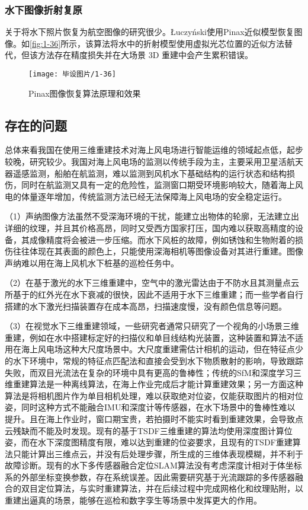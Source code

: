 \subsubsection{水下图像折射复原}

关于将水下照片恢复为航空图像的研究很少。Łuczyński\cite{Łuczyński}使用Pinax近似模型恢复图像。如\autoref{fig:1-36}所示，该算法将水中的折射模型使用虚拟光芯位置的近似方法替代，但该方法存在精度损失并在大场景 3D 重建中会产生累积错误。

\begin{figure}[htbp]
    \centering
    \texttt{[image: 毕设图片/1-36]}
    \caption{\label{fig:1-36}Pinax图像恢复算法原理和效果}
\end{figure}

\subsection{存在的问题}

总体来看我国在使用三维重建技术对海上风电场进行智能运维的领域起点低，起步较晚，研究较少。我国对海上风电场的监测以传统手段为主，主要采用卫星活航天器遥感监测，船舶在航监测，难以监测到风机水下基础结构的运行状态和结构损伤，同时在航监测又具有一定的危险性，监测窗口期受环境影响较大，随着海上风电的体量逐年增加，传统监测方法已经无法保障海上风电场的安全稳定运行。

（1）声纳图像方法虽然不受深海环境的干扰，能建立出物体的轮廓，无法建立出详细的纹理，并且其价格高昂，同时又受西方国家打压，国内难以获取高精度的设备，其成像精度将会被进一步压缩。而水下风桩的故障，例如锈蚀和生物附着的损伤往往体现在其表面的颜色上，只能使用深海相机等图像设备对其进行重建。图像声纳难以用在海上风机水下桩基的巡检任务中。

（2）在基于激光的水下三维重建中，空气中的激光雷达由于不防水且其测量点云所基于的红外光在水下衰减的很快，因此不适用于水下三维重建；而一些学者自行搭建的水下激光扫描装置存在成本高昂，扫描速度慢，没有颜色信息等问题。

（3）在视觉水下三维重建领域，一些研究者通常只研究了一个视角的小场景三维重建，例如在水中搭建标定好的扫描仪和单目线结构光装置，这种装置和算法不适用在海上风电场这种大尺度场景中。大尺度重建需估计相机的运动，但在特征点少的水下环境中，常规的特征点匹配法和直接会受到水下物质散射的影响，导致跟踪失败，而双目光流法在复杂的环境中具有更高的鲁棒性；传统的SfM和深度学习三维重建算法是一种离线算法，在海上作业完成后才能计算重建效果；另一方面这种算法是将相机图片作为单目相机处理，难以获取绝对位姿，仅能获取图片的相对位姿，同时这种方式不能融合IMU和深度计等传感器，在水下场景中的鲁棒性难以提升。且在海上作业时，窗口期宝贵，若拍摄时不能实时看到重建效果，会导致点云残缺而不能及时发现。现有的基于TSDF三维重建的算法均使用深度图计算位姿，而在水下深度图精度有限，难以达到重建的位姿要求，且现有的TSDF重建算法只能计算出三维点云，并没有后处理步骤，所生成的三维体表现模糊，并不利于故障诊断。现有的水下多传感器融合定位SLAM算法没有考虑深度计相对于体坐标系的外部坐标变换参数，存在系统误差。因此需要研究基于光流跟踪的多传感器融合的双目定位算法，与实时重建算法，并在后续过程中完成网格化和纹理贴附，以重建出逼真的场景，能够在巡检和数字孪生等场景中发挥更大的作用。

